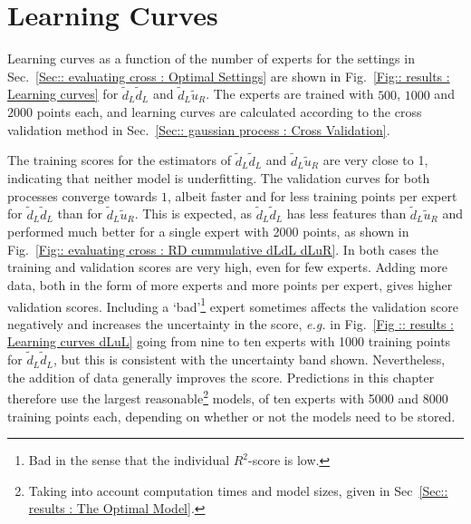 \documentclass[twoside,english]{uiofysmaster}
\begin{document}
{{\section{Learning Curves}

Learning curves as a function of the number of experts for the settings in Sec.~\ref{Sec:: evaluating cross : Optimal Settings} are shown in Fig.~\ref{Fig:: results : Learning curves} for $\widetilde{d}_L \widetilde{d}_L$ and $\widetilde{d}_L \widetilde{u}_R$. The experts are trained with $500$, $1000$ and $2000$ points each, and learning curves are calculated according to the cross validation method in Sec.~\ref{Sec:: gaussian process : Cross Validation}.

The training scores for the estimators of $\widetilde{d}_L \widetilde{d}_L$ and $\widetilde{d}_L \widetilde{u}_R$ are very close to 1, indicating that neither model is underfitting. The validation curves for both processes converge towards $1$, albeit faster and for less training points per expert for $\widetilde{d}_L \widetilde{d}_L$ than for $\widetilde{d}_L \widetilde{u}_R$. This is expected, as $\widetilde{d}_L \widetilde{d}_L$ has less features than $\widetilde{d}_L \widetilde{u}_R$ and performed much better for a single expert with 2000 points, as shown in Fig.~\ref{Fig:: evaluating cross : RD cummulative dLdL dLuR}. In both cases the training and validation scores are very high, even for few experts. Adding more data, both in the form of more experts and more points per expert, gives higher validation scores. Including a `bad'\footnote{Bad in the sense that the individual $R^2$-score is low.} expert sometimes affects the validation score negatively and increases the uncertainty in the score, \textit{e.g.} in Fig.~\ref{Fig :: results : Learning curves dLuL} going from nine to ten experts with 1000 training points for $\widetilde{d}_L \widetilde{d}_L$, but this is consistent with the uncertainty band shown. Nevertheless, the addition of data generally improves the score. Predictions in this chapter therefore use the largest reasonable\footnote{Taking into account computation times and model sizes, given in Sec~\ref{Sec:: results : The Optimal Model}.} models, of ten experts with 5000 and 8000 training points each, depending on whether or not the models need to be stored.



}}
\end{document}
